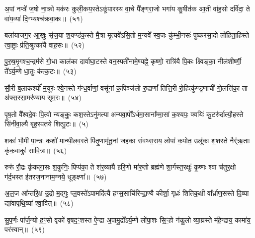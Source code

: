 {\anuvakamend[{म॒युस्त्रयो॑विꣳशतिः}]}%

अ॒पां नप्त्रे॑ ज॒षो ना॒क्रो मक॑रः कुली॒कय॒स्ते\-ऽकू॑पारस्य वा॒चे पै᳚ङ्गरा॒जो भगा॑य कु॒षीत॑क आ॒ती वा॑ह॒सो दर्वि॑दा॒ ते वा॑य॒व्या॑ दि॒ग्भ्यश्च॑क्रवा॒कः॥~(५१)

{\anuvakamend[{अ॒पामेका॒न्नविꣳ॑शतिः}]}%

बला॑याजग॒र आ॒खुः सृ॑ज॒या श॒यण्ड॑क॒स्ते मै॒त्रा मृ॒त्यवे॑\-ऽसि॒तो म॒न्यवे᳚ स्व॒जः कु॑म्भी॒नसः॑ पुष्करसा॒दो लो॑हिता॒हिस्ते त्वा॒ष्ट्राः प्र॑ति॒श्रुत्का॑यै वाह॒सः॥~(५२)

{\anuvakamend[{}]}

पु॒रु॒ष॒मृ॒गश्च॒न्द्रम॑से गो॒धा काल॑का दार्वाघा॒टस्ते वन॒स्पती॑नामे॒ण्यह्ने॒ कृष्णो॒ रात्रि॑यै पि॒कः क्ष्विङ्का॒ नील॑शीर्ष्णी॒ ते᳚\-ऽर्य॒म्णे धा॒तुः क॑त्क॒टः॥~(५३)

{\anuvakamend[{}]}

सौ॒री ब॒लाकर्श्यो॑ म॒यूरः॑ श्ये॒नस्ते ग॑न्ध॒र्वाणां॒ वसू॑नां क॒पिञ्ज॑लो रु॒द्राणां᳚ तित्ति॒री रो॒हित्कु॑ण्डृ॒णाची॑ गो॒लत्ति॑का॒ ता अ॑फ्स॒रसा॒मर॑ण्याय सृम॒रः॥~(५४)

{\anuvakamend[{}]}

पृ॒ष॒तो वै᳚श्वदे॒वः पि॒त्वो न्यङ्कुः॒ कश॒स्ते\-ऽनु॑मत्या अन्यवा॒पो᳚\-ऽर्धमा॒साना᳚म्मा॒सां क॒श्यपः॒ क्वयिः॑ कु॒टरु॑र्दात्यौ॒हस्ते सि॑नीवा॒ल्यै बृह॒स्पत॑ये शित्पु॒टः॥~(५)

{\anuvakamend[{}]}

शका॑ भौ॒मी पा॒न्त्रः कशो॑ मान्थी॒लव॒स्ते पि॑तृ॒णामृ॑तू॒नां जह॑का संवथ्स॒राय॒ लोपा॑ क॒पोत॒ उलू॑कः श॒शस्ते नैर्\mbox{}॑ऋ॒ताः कृ॑क॒वाकुः॑ सावि॒त्रः॥~(५६)

{\anuvakamend[{बला॑य पुरुषमृ॒गः सौ॒री पृ॑ष॒तः शका॒ष्टाद॑शा॒ष्टाद॑श}]}%

रुरू॑ रौ॒द्रः कृ॑कला॒सः श॒कुनिः॒ पिप्प॑का॒ ते श॑र॒व्या॑यै हरि॒णो मा॑रु॒तो ब्रह्म॑णे शा॒र्गस्त॒रक्षुः॑ कृ॒ष्णः श्वा च॑तुर॒क्षो ग॑र्द॒भस्त इ॑तरज॒नाना॑म॒ग्नये॒ धूङ्क्ष्णा᳚॥~(५७)

{\anuvakamend[{रुरु॑र्विꣳश॒तिः}]}%

अ॒ल॒ज आ᳚न्तरि॒क्ष उ॒द्रो म॒द्गुः प्ल॒वस्ते॑\-ऽपामदि॑त्यै हꣳस॒साचि॑रिन्द्रा॒ण्यै कीर्\mbox{}शा॒ गृध्रः॑ शितिक॒क्षी वा᳚र्ध्राण॒सस्ते दि॒व्या द्या॑वापृथि॒व्या᳚ श्वा॒वित्॥~(५८)

{\anuvakamend[{}]}

सु॒प॒र्णः पा᳚र्ज॒न्यो ह॒ꣳ॒सो वृको॑ वृषद॒ꣳ॒शस्त ऐ॒न्द्रा अ॒पामु॒द्रो᳚\-ऽर्य॒म्णे लो॑पा॒शः सि॒ꣳ॒हो न॑कु॒लो व्या॒घ्रस्ते म॑हे॒न्द्राय॒ कामा॑य॒ पर॑स्वान्॥~(५९)

